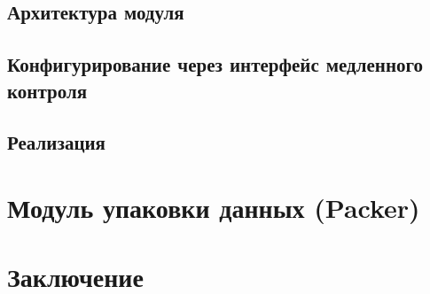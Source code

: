 \documentclass[a4paper, 14pt]{extarticle}
\begin{document}
    \subsection{Архитектура модуля}
    
    \subsection{Конфигурирование через интерфейс медленного контроля}
    
    \subsection{Реализация}
    
    \newpage

\section{Модуль упаковки данных (Packer)}
    
\newpage

%    
%    
%    

\section*{Заключение}
    
    \newpage

%
\printbibliography

\end{document}
